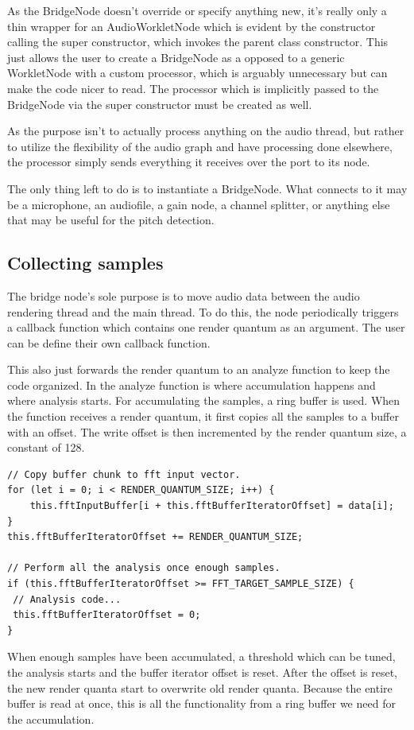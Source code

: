 As the BridgeNode doesn't override or specify anything new, it's really only a thin wrapper for an AudioWorkletNode which is evident by the constructor calling the super constructor, which invokes the parent class constructor. This just allows the user to create a BridgeNode as a opposed to a generic WorkletNode with a custom processor, which is arguably unnecessary but can make the code nicer to read. The processor which is implicitly passed to the BridgeNode via the super constructor must be created as well.

As the purpose isn't to actually process anything on the audio thread, but rather to utilize the flexibility of the audio graph and have processing done elsewhere, the processor simply sends everything it receives over the port to its node. 

The only thing left to do is to instantiate a BridgeNode. What connects to it may be a microphone, an audiofile, a gain node, a channel splitter, or anything else that may be useful for the pitch detection.


\subsection{Collecting samples}
The bridge node's sole purpose is to move audio data between the audio rendering thread and the main thread. To do this, the node periodically triggers a callback function which contains one render quantum as an argument. The user can be define their own callback function.

This also just forwards the render quantum to an analyze function to keep the code organized. In the analyze function is where accumulation happens and where analysis starts. For accumulating the samples, a ring buffer is used. When the function receives a render quantum, it first copies all the samples to a buffer with an offset. The write offset is then incremented by the render quantum size, a constant of 128.
\begin{lstlisting}[style=javascript]
// Copy buffer chunk to fft input vector.
for (let i = 0; i < RENDER_QUANTUM_SIZE; i++) {
    this.fftInputBuffer[i + this.fftBufferIteratorOffset] = data[i];
}
this.fftBufferIteratorOffset += RENDER_QUANTUM_SIZE;

// Perform all the analysis once enough samples.
if (this.fftBufferIteratorOffset >= FFT_TARGET_SAMPLE_SIZE) {
 // Analysis code...
 this.fftBufferIteratorOffset = 0;
}
\end{lstlisting}
When enough samples have been accumulated, a threshold which can be tuned, the analysis starts and the buffer iterator offset is reset. After the offset is reset, the new render quanta start to overwrite old render quanta. Because the entire buffer is read at once, this is all the functionality from a ring buffer we need for the accumulation. 

